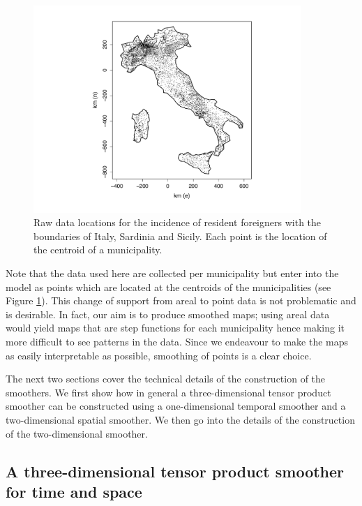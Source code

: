 \begin{figure}[tbp]
	\centering
		\includegraphics[width=4in]{it/pointmap.pdf}
	\caption{Raw data locations for the incidence of resident foreigners with the boundaries of Italy, Sardinia and Sicily. Each point is the location of the centroid of a municipality.}
	\label{pointmap}
\end{figure}

Note that the data used here are collected per municipality but enter into the model as points which are located at the centroids of the municipalities (see Figure \ref{pointmap}). This change of support from areal to point data is not problematic and is desirable. In fact, our aim is to produce smoothed maps; using areal data would yield maps that are step functions for each municipality hence making it more difficult to see patterns in the data. Since we endeavour to make the maps as easily interpretable as possible, smoothing of points is a clear choice.

The next two sections cover the technical details of the construction of the smoothers. We first show how in general a three-dimensional tensor product smoother can be constructed using a one-dimensional temporal smoother and a two-dimensional spatial smoother. We then go into the details of the construction of the two-dimensional smoother.

\subsection{A three-dimensional tensor product smoother for time and space \label{3D}}

